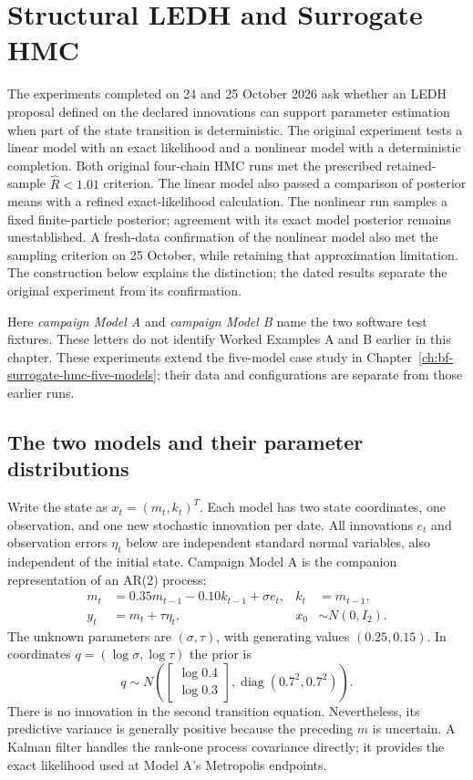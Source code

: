 \section{Structural LEDH and Surrogate HMC}
\label{sec:bf-structural-ledh-ab-campaign}

The experiments completed on 24 and 25 October 2026 ask whether an LEDH proposal
defined on the declared innovations can support parameter estimation when
part of the state transition is deterministic.  The original experiment tests
a linear model with an exact likelihood and a nonlinear model with a
deterministic completion.
Both original four-chain HMC runs met the prescribed retained-sample $\widehat R<1.01$
criterion.  The linear model also passed a comparison of posterior means with
a refined exact-likelihood calculation.  The nonlinear run samples a fixed
finite-particle posterior; agreement with its exact model posterior remains
unestablished.  A fresh-data confirmation of the nonlinear model also met the
sampling criterion on 25 October, while retaining that approximation limitation.
The construction below explains the distinction; the dated results separate
the original experiment from its confirmation.

Here \emph{campaign Model A} and \emph{campaign Model B} name the two software
test fixtures.  These letters do not identify Worked Examples A and B earlier
in this chapter.  These experiments extend the five-model case study in
Chapter~\ref{ch:bf-surrogate-hmc-five-models}; their data and configurations are
separate from those earlier runs.

\subsection{The two models and their parameter distributions}

Write the state as $x_t=(m_t,k_t)^T$.  Each model has two state coordinates,
one observation, and one new stochastic innovation per date.  All innovations
$e_t$ and observation errors $\eta_t$ below are independent standard normal
variables, also independent of the initial state.
Campaign Model A is the companion representation of an AR(2) process:
\begin{align}
 m_t &= 0.35m_{t-1}-0.10k_{t-1}+\sigma e_t,
 & k_t &= m_{t-1}, \label{eq:bf-campaign-a-transition}\\
 y_t &= m_t+\tau\eta_t,
 & x_0 &\sim N(0,I_2).
\end{align}
The unknown parameters are $(\sigma,\tau)$, with generating values
$(0.25,0.15)$.  In coordinates $q=(\log\sigma,\log\tau)$ the prior is
\[
 q\sim N\!\left(
   \begin{bmatrix}\log 0.4\\\log 0.3\end{bmatrix},
   \operatorname{diag}(0.7^2,0.7^2)\right).
\]
There is no innovation in the second transition equation.  Nevertheless, its
predictive variance is generally positive because the preceding $m$ is
uncertain.  A Kalman filter handles the rank-one process covariance directly;
it provides the exact likelihood used at Model A's Metropolis endpoints.

